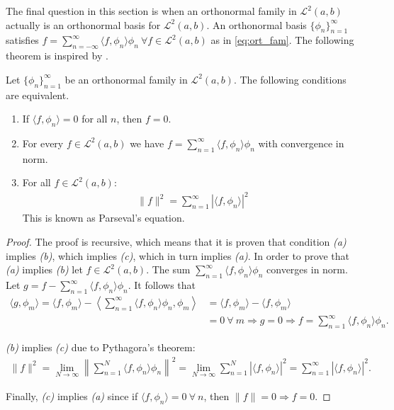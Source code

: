 The final question in this section is when an orthonormal family in $\mathcal{L}^2(a,b)$ actually is an orthonormal basis for $\mathcal{L}^2(a,b)$. An orthonormal basis $\{\phi_n\}_{n=1}^\infty$ satisfies $f = \sum_{n=-\infty}^\infty \langle f, \phi_n \rangle \phi_n \ \forall f \in \mathcal{L}^2(a,b)$ as in \eqref{eq:ort_fam}. The following theorem is inspired by \cite{page 77, FAA}.

\begin{theorem} \label{theo:Fourier_series_Parseval}
Let $\{\phi_n\}_{n=1}^\infty$ be an orthonormal family in $\mathcal{L}^2(a,b)$. The following conditions are equivalent.
\begin{enumerate}[label=(\alph*)]
\item If $\langle f, \phi_n \rangle = 0$ for all $n$, then $f = 0$.
\item For every $f \in \mathcal{L}^2(a,b)$ we have $f = \sum_{n=1}^\infty \langle f, \phi_n \rangle \phi_n$ with convergence in norm.\\
\item For all $f \in \mathcal{L}^2(a,b)$:
\begin{align*}
\|f\|^2 = \sum_{n=1}^\infty |\langle f,\phi_n \rangle|^2
\end{align*}
This is known as Parseval's equation.
\end{enumerate}
\end{theorem}

\begin{proof}
The proof is recursive, which means that it is proven that condition \textit{(a)} implies \textit{(b)}, which implies \textit{(c)}, which in turn implies \textit{(a)}. In order to prove that \textit{(a)} implies \textit{(b)} let $f\in\mathcal{L}^2(a,b)$. The sum $\sum_{n=1}^\infty \langle f,\phi_n \rangle \phi_n$ converges in norm. Let $g = f - \sum_{n=1}^\infty \langle f,\phi_n \rangle \phi_n$. It follows that
\begin{align*}
\langle g,\phi_m \rangle = \langle f, \phi_m \rangle - \left\langle \sum_{n=1}^\infty \langle f,\phi_n\rangle \phi_n, \phi_m \right\rangle &= \langle f, \phi_m \rangle - \langle f, \phi_m \rangle \\
&= 0 \ \forall \ m \Rightarrow g = 0 \Rightarrow f = \sum_{n=1}^\infty \langle f,\phi_n \rangle \phi_n.
\end{align*}

\textit{(b)} implies \textit{(c)} due to Pythagora's theorem:
\begin{align*}
\|f\|^2 = \lim_{N\to\infty} \left\| \sum_{n=1}^N \langle f,\phi_n \rangle \phi_n \right\|^2 = \lim_{N\to\infty} \sum_{n=1}^N |\langle f,\phi_n \rangle|^2 = \sum_{n=1}^\infty |\langle f,\phi_n \rangle|^2.
\end{align*}

Finally, \textit{(c)} implies \textit{(a)} since if $\langle f,\phi_n \rangle = 0 \ \forall \ n$, then $\|f\| = 0 \Rightarrow f = 0$.
\end{proof}



\clearpage